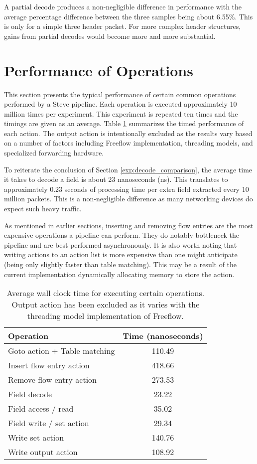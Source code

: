 A partial decode produces a non-negligible difference in performance with the average percentage difference between the three samples being about 6.55\%. This is only for a simple three header packet. For more complex header structures, gains from partial decodes would become more and more substantial.


\section{Performance of Operations} \label{exp:action_performance}

This section presents the typical performance of certain common operations performed by a Steve pipeline. Each operation is executed approximately 10 million times per experiment. This experiment is repeated ten times and the timings are given as an average. Table \ref{tbl:action_stats} summarizes the timed performance of each action. The output action is intentionally excluded as the results vary based on a number of factors including Freeflow implementation, threading models, and specialized forwarding hardware.

To reiterate the conclusion of Section \ref{exp:decode_comparison}, the average time it takes to decode a field is about 23 nanoseconds (ns). This translates to approximately 0.23 seconds of processing time per extra field extracted every 10 million packets. This is a non-negligible difference as many networking devices do expect such heavy traffic.

As mentioned in earlier sections, inserting and removing flow entries are the most expensive operations a pipeline can perform. They do notably bottleneck the pipeline and are best performed asynchronously.
It is also worth noting that writing actions to an action list is more expensive than one might anticipate (being only slightly faster than table matching). This may be a result of the current implementation dynamically allocating memory to store the action.

\begin{table}[ht]
\caption{Average wall clock time for executing certain operations. Output action has been excluded as it varies with the threading model implementation of Freeflow.}
\begin{center}
\begin{tabularx}{\linewidth}{| X || c | }
\hline
Operation & Time (nanoseconds)  \\
\hline
Goto action + Table matching & 110.49 \\
\hline
Insert flow entry action & 418.66 \\
\hline
Remove flow entry action & 273.53 \\
\hline
Field decode & 23.22 \\
\hline
Field access / read & 35.02 \\
\hline
Field write / set action & 29.34 \\
\hline
Write set action &  140.76 \\
\hline
Write output action & 108.92 \\
\hline
\end{tabularx}
\end{center}
\label{tbl:action_stats}
\end{table}

